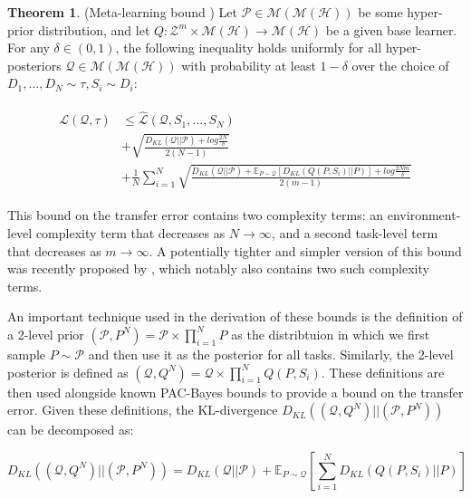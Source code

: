 \documentclass{article}
\theoremstyle{definition}
\newtheorem{theorem}{Theorem}[section]
\newcommand{\Expect}[2]{\mathbb{E}_{#1}\left [#2 \right ]}
\begin{document}
\begin{theorem} (Meta-learning bound \citep{Amit2018}) \label{thm:meta-pb}
	Let $\mathcal{P}\in \mathcal{M}(\mathcal{M}(\mathcal{H}))$ be some hyper-prior distribution, and let $Q: \mathcal{Z}^m\times\mathcal{M}(\mathcal{H})\rightarrow \mathcal{M}(\mathcal{H})$ be a given base learner.
	For any $\delta \in (0,1)$, the following inequality holds uniformly for all hyper-posteriors $\mathcal{Q}\in \mathcal{M}(\mathcal{M}(\mathcal{H}))$ with probability at least $1-\delta$ over the choice of $D_1,...,D_N\sim \tau, S_i\sim D_i$:
	
	\begin{align} \label{eq:meta-pb-amit}
	\begin{split}
	\mathcal{L}(\mathcal{Q}, \tau) &\leq \hat{\mathcal{L}}(\mathcal{Q}, S_1,...,S_N) \\
	&+\sqrt{\frac{D_{KL}(\mathcal{Q}||\mathcal{P})+log\frac{2N}{\delta}}{2(N-1)}} \\
	&+\frac{1}{N}\sum_{i=1}^{N}\sqrt{\frac{D_{KL}(\mathcal{Q}||\mathcal{P})+\Expect{P\sim \mathcal{Q}}{D_{KL}(Q(P,S_i)||P)}+log\frac{2Nm}{\delta}}{2(m-1)}}
	\end{split}
	\end{align}

\end{theorem}

This bound on the transfer error contains two complexity terms: an environment-level complexity term that decreases as $N\rightarrow \infty$, and a second task-level term that decreases as $m\rightarrow \infty$. A potentially tighter and simpler version of this bound was recently proposed by \cite{Rothfuss2020}, which notably also contains two such complexity terms.

An important technique used in the derivation of these bounds is the definition of a 2-level prior $(\mathcal{P}, P^N)=\mathcal{P}\times \prod_{i=1}^{N}P$ as the distribtuion in which we first sample $P\sim \mathcal{P}$ and then use it as the posterior for all tasks. Similarly, the 2-level posterior is defined as $(\mathcal{Q}, Q^N)=\mathcal{Q}\times \prod_{i=1}^{N}Q(P, S_i)$. These definitions are then used alongside known PAC-Bayes bounds to provide a bound on the transfer error. Given these definitions, the KL-divergence $D_{KL}\left ((\mathcal{Q}, Q^N)||(\mathcal{P}, P^N)\right )$ can be decomposed as:

\begin{equation} \label{eq:kl-decompose}
 D_{KL}\left ((\mathcal{Q}, Q^N)||(\mathcal{P}, P^N)\right ) = D_{KL}(\mathcal{Q}||\mathcal{P}) + \Expect{P\sim \mathcal{Q}}{\sum_{i=1}^{N}D_{KL}(Q(P, S_i)||P)}
\end{equation}
\end{document}
